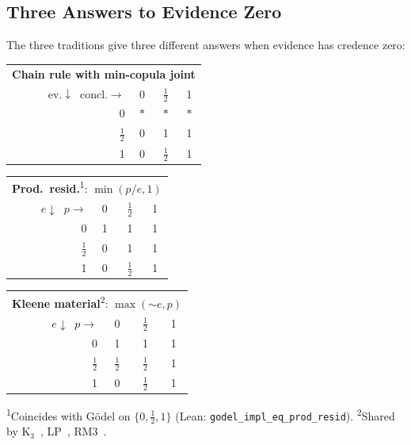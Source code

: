 \documentclass[11pt,a4paper]{article}
\newcommand{\negc}{\mathord{\sim}}
\begin{document}
\subsection{Three Answers to Evidence Zero}

The three traditions give three different answers when evidence
has credence zero:

\begin{center}
\small
\begin{tabular}{r|ccc}
\multicolumn{4}{c}{\textbf{Chain rule with min-copula joint}} \\
$\mathrm{ev.} \downarrow\;\; \mathrm{concl.}\to$
  & 0 & $\tfrac{1}{2}$ & 1 \\
\hline
0 & $*$ & $*$ & $*$ \\
$\tfrac{1}{2}$ & 0 & 1 & 1 \\
1 & 0 & $\tfrac{1}{2}$ & 1
\end{tabular}
\quad
\begin{tabular}{r|ccc}
\multicolumn{4}{c}{\textbf{Prod.\ resid.}\textsuperscript{1}:
  $\min(p/e, 1)$} \\
$e \!\downarrow\;\; p\to$
  & 0 & $\tfrac{1}{2}$ & 1 \\
\hline
0 & 1 & 1 & 1 \\
$\tfrac{1}{2}$ & 0 & 1 & 1 \\
1 & 0 & $\tfrac{1}{2}$ & 1
\end{tabular}
\quad
\begin{tabular}{r|ccc}
\multicolumn{4}{c}{\textbf{Kleene material}\textsuperscript{2}:
  $\max(\negc e, p)$} \\
$e \!\downarrow\;\; p\to$
  & 0 & $\tfrac{1}{2}$ & 1 \\
\hline
0 & 1 & 1 & 1 \\
$\tfrac{1}{2}$ & $\tfrac{1}{2}$ & $\tfrac{1}{2}$ & 1 \\
1 & 0 & $\tfrac{1}{2}$ & 1
\end{tabular}
\normalsize
{}
\label{tab:three-conditionals}
\end{center}
\smallskip
\noindent
{\footnotesize
\textsuperscript{1}Coincides with G\"odel on
$\{0, \tfrac{1}{2}, 1\}$
(Lean: \texttt{godel\_impl\_eq\_prod\_resid}).
\textsuperscript{2}Shared by K$_3$~\cite{kleene1952},
LP~\cite{asenjo1966,priest1979},
RM3~\cite{anderson1975,meyer1972}.}

\medskip
\end{document}
